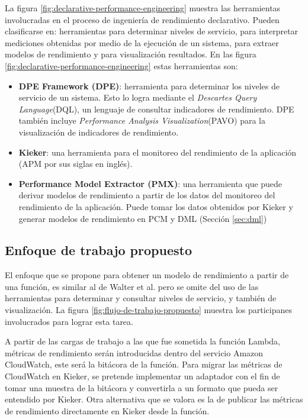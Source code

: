 La figura \ref{fig:declarative-performance-engineering} muestra las herramientas involucradas en el proceso de ingeniería de rendimiento declarativo. Pueden clasificarse en: herramientas para determinar niveles de servicio, para interpretar mediciones obtenidas por medio de la ejecución de un sistema, para extraer modelos de rendimiento y para visualización resultados. En las figura \ref{fig:declarative-performance-engineering} estas herramientas son:
\begin{itemize}
    \item \textbf{DPE Framework (DPE)}: herramienta para determinar los niveles de servicio de un sistema. Esto lo logra mediante el \emph{Descartes Query Language}(DQL), un lenguaje de consultar indicadores de rendimiento. DPE también incluye \emph{Performance Analysis Visualization}(PAVO) para la visualización de indicadores de rendimiento.
    \item \textbf{Kieker}: una herramienta para el monitoreo del rendimiento de la aplicación (APM por sus siglas en inglés). 
    \item \textbf{Performance Model Extractor (PMX)}: una herramienta que puede derivar modelos de rendimiento a partir de los datos del monitoreo del rendimiento de la aplicación. Puede tomar los datos obtenidos por Kieker y generar modelos de rendimiento en PCM y DML (Sección \ref{sec:dml})
\end{itemize}

\subsection{Enfoque de trabajo propuesto}
El enfoque que se propone para obtener un modelo de rendimiento a partir de una función, es similar al de Walter et al. pero se omite del uso de las herramientas para determinar y consultar niveles de servicio, y también de visualización. La figura \ref{fig:flujo-de-trabajo-propuesto} muestra los participanes involucrados para lograr esta tarea. 

A partir de las cargas de trabajo a las que fue sometida la función Lambda, métricas de rendimiento serán introducidas dentro del servicio Amazon CloudWatch, este será la bitácora de la función. Para migrar las métricas de CloudWatch en Kieker, se pretende implementar un adaptador con el fin de tomar una muestra de la bitácora y convertirla a un formato que pueda ser entendido por Kieker. Otra alternativa que se valora es la de publicar las métricas de rendimiento directamente en Kieker  desde la función. 

